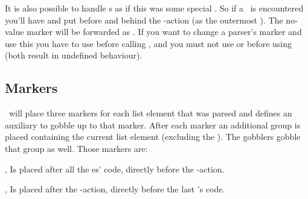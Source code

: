\begin{function}{\ekvpDefNoValuePrefix}
  \begin{syntax}
  \end{syntax}
  It is also possible to handle \Nkey{}s as if this was some special \prefix.
  So if a \Nkey\ is encountered you'll have  and  put
  before and behind the \type-action (as the outermost \prefix). The no-value
  marker will be forwarded as \val. If you want to change a parser's marker and
  use this you have to use  before calling
  , and you must not use  or
   before using  (both
  result in undefined behaviour).
\end{function}



\subsection{Markers}

\expkvp\ will place three markers for each list element that was parsed and
defines an auxiliary to gobble up to that marker. After each marker an
additional group is placed containing the current list element (excluding the
\val). The gobblers gobble that group as well. Those markers are:

\begin{function}{\ekvpEOP,\ekvpGobbleP}
  Is placed after all the \prefix{}es'  code, directly before the
  \type-action.
\end{function}

\begin{function}{\ekvpEOT,\ekvpGobbleT}
  Is placed after the \type-action, directly before the last \prefix's
   code.
\end{function}


